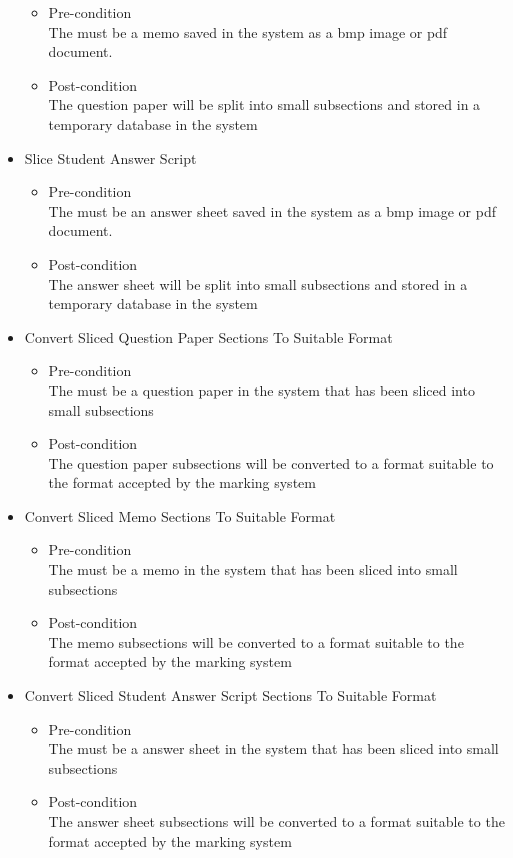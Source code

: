 \documentclass{article}
\begin{document}
\begin{itemize}
\begin{itemize}
				\item Pre-condition  \\
					 The must be a memo  saved in the system as a bmp image or pdf document.
				\item Post-condition \\
					 The question paper will be split into small subsections and stored in a temporary database in the system
			\end{itemize}
		\item Slice Student Answer Script
			\begin{itemize}
				\item Pre-condition  \\
					 The must be an answer sheet saved in the system as a bmp image or pdf document.
				\item Post-condition \\
					 The answer sheet will be split into small subsections and stored in a temporary database in the system
			\end{itemize}
		\item Convert Sliced  Question Paper Sections To Suitable Format
			\begin{itemize}
				\item Pre-condition \\
					 The must be a question paper in  the system that has been sliced into small subsections
				\item Post-condition \\
					 The question paper subsections will be converted to a format suitable to the format accepted by the marking system
			\end{itemize}
		\item Convert Sliced  Memo Sections To Suitable Format
			\begin{itemize}
				\item Pre-condition \\
					 The must be a memo in  the system that has been sliced into small subsections
				\item Post-condition \\
					 The memo subsections will be converted to a format suitable to the format accepted by the marking system
			\end{itemize}
		\item Convert Sliced  Student Answer Script Sections  To Suitable Format
			\begin{itemize}
				\item Pre-condition \\
					 The must be a answer sheet in  the system that has been sliced into small subsections
				\item Post-condition \\
					 The answer sheet subsections will be converted to a format suitable to the format accepted by the marking system
			
			\end{itemize}


	\end{itemize}
\end{document}
